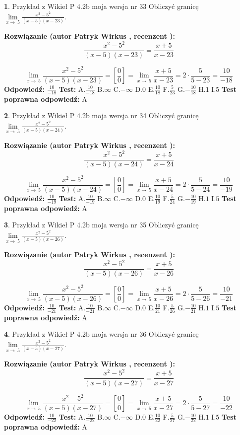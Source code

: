 \documentclass[12pt, a4paper]{article}
\theoremstyle{definition} %
\newtheorem{zad}{}
\newcommand{\zadStart}[1]{\begin{zad}#1\newline}
\newcommand{\zadStop}{\end{zad}}
\newcommand{\rozwStart}[2]{\noindent \textbf{Rozwiązanie (autor #1 , recenzent #2): }\newline}
\newcommand{\rozwStop}{\newline}
\newcommand{\odpStart}{\noindent \textbf{Odpowiedź:}\newline}
\newcommand{\odpStop}{\newline}
\newcommand{\testStart}{\noindent \textbf{Test:}\newline}
\newcommand{\testStop}{\newline}
\newcommand{\kluczStart}{\noindent \textbf{Test poprawna odpowiedź:}\newline}
\newcommand{\kluczStop}{\newline}
\begin{document}
\zadStart{Przykład z Wikieł P 4.2b moja wersja nr 33}
Obliczyć granicę $\lim\limits_{x\to\ 5}\frac{x^{2}-5^{2}}{(x-5)(x-23)}$.
\zadStop
\rozwStart{Patryk Wirkus}{}
$$\frac{x^{2}-5^{2}}{(x-5)(x-23)}=\frac{x+5}{x-23}$$

$$\lim\limits_{x\to\ 5}\frac{x^{2}-5^{2}}{(x-5)(x-23)}=[\frac{0}{0}]=\lim\limits_{x\to\ 5}\frac{x+5}{x-23}=2 \cdot \frac{5}{5-23} = \frac{10}{-18}$$
\rozwStop
\odpStart
$\frac{10}{-18}$
\odpStop
\testStart
A.$\frac{10}{-18}$
B.$\infty$
C.$-\infty$
D.$0$
E.$\frac{10}{18}$
F.$\frac{5}{23}$
G.$-\frac{10}{18}$
H.$1$
I.$5$
\testStop
\kluczStart
A
\kluczStop



\zadStart{Przykład z Wikieł P 4.2b moja wersja nr 34}
Obliczyć granicę $\lim\limits_{x\to\ 5}\frac{x^{2}-5^{2}}{(x-5)(x-24)}$.
\zadStop
\rozwStart{Patryk Wirkus}{}
$$\frac{x^{2}-5^{2}}{(x-5)(x-24)}=\frac{x+5}{x-24}$$

$$\lim\limits_{x\to\ 5}\frac{x^{2}-5^{2}}{(x-5)(x-24)}=[\frac{0}{0}]=\lim\limits_{x\to\ 5}\frac{x+5}{x-24}=2 \cdot \frac{5}{5-24} = \frac{10}{-19}$$
\rozwStop
\odpStart
$\frac{10}{-19}$
\odpStop
\testStart
A.$\frac{10}{-19}$
B.$\infty$
C.$-\infty$
D.$0$
E.$\frac{10}{19}$
F.$\frac{5}{24}$
G.$-\frac{10}{19}$
H.$1$
I.$5$
\testStop
\kluczStart
A
\kluczStop



\zadStart{Przykład z Wikieł P 4.2b moja wersja nr 35}
Obliczyć granicę $\lim\limits_{x\to\ 5}\frac{x^{2}-5^{2}}{(x-5)(x-26)}$.
\zadStop
\rozwStart{Patryk Wirkus}{}
$$\frac{x^{2}-5^{2}}{(x-5)(x-26)}=\frac{x+5}{x-26}$$

$$\lim\limits_{x\to\ 5}\frac{x^{2}-5^{2}}{(x-5)(x-26)}=[\frac{0}{0}]=\lim\limits_{x\to\ 5}\frac{x+5}{x-26}=2 \cdot \frac{5}{5-26} = \frac{10}{-21}$$
\rozwStop
\odpStart
$\frac{10}{-21}$
\odpStop
\testStart
A.$\frac{10}{-21}$
B.$\infty$
C.$-\infty$
D.$0$
E.$\frac{10}{21}$
F.$\frac{5}{26}$
G.$-\frac{10}{21}$
H.$1$
I.$5$
\testStop
\kluczStart
A
\kluczStop



\zadStart{Przykład z Wikieł P 4.2b moja wersja nr 36}
Obliczyć granicę $\lim\limits_{x\to\ 5}\frac{x^{2}-5^{2}}{(x-5)(x-27)}$.
\zadStop
\rozwStart{Patryk Wirkus}{}
$$\frac{x^{2}-5^{2}}{(x-5)(x-27)}=\frac{x+5}{x-27}$$

$$\lim\limits_{x\to\ 5}\frac{x^{2}-5^{2}}{(x-5)(x-27)}=[\frac{0}{0}]=\lim\limits_{x\to\ 5}\frac{x+5}{x-27}=2 \cdot \frac{5}{5-27} = \frac{10}{-22}$$
\rozwStop
\odpStart
$\frac{10}{-22}$
\odpStop
\testStart
A.$\frac{10}{-22}$
B.$\infty$
C.$-\infty$
D.$0$
E.$\frac{10}{22}$
F.$\frac{5}{27}$
G.$-\frac{10}{22}$
H.$1$
I.$5$
\testStop
\kluczStart
A
\kluczStop
\end{document}
